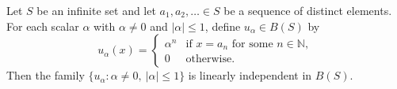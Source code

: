 Let $S$ be an infinite set and let $a_1, a_2, \ldots \in S$ be a sequence of distinct elements. For each scalar $\alpha$ with $\alpha \neq 0$ and $|\alpha| \leq 1$, define $u_\alpha \in B(S)$ by
$$
u_\alpha(x) = \begin{cases}
\alpha^n & \text{if } x = a_n \text{ for some } n \in \mathbb{N}, \\
0 & \text{otherwise}.
\end{cases}
$$
Then the family $\{u_\alpha : \alpha \neq 0,\ |\alpha| \leq 1\}$ is linearly independent in $B(S)$.
